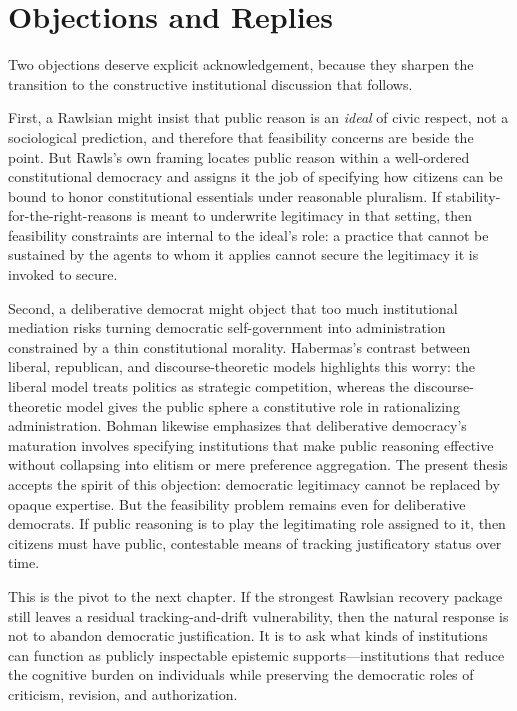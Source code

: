 \documentclass[12pt]{report}
\begin{document}
\section{Objections and Replies}

Two objections deserve explicit acknowledgement, because they sharpen the transition to the constructive institutional discussion that follows.

First, a Rawlsian might insist that public reason is an \emph{ideal} of civic respect, not a sociological prediction, and therefore that feasibility concerns are beside the point. But Rawls’s own framing locates public reason within a well-ordered constitutional democracy and assigns it the job of specifying how citizens can be bound to honor constitutional essentials under reasonable pluralism. \parencite[pp.~765--767]{rawls1997public} If stability-for-the-right-reasons is meant to underwrite legitimacy in that setting, then feasibility constraints are internal to the ideal’s role: a practice that cannot be sustained by the agents to whom it applies cannot secure the legitimacy it is invoked to secure.

Second, a deliberative democrat might object that too much institutional mediation risks turning democratic self-government into administration constrained by a thin constitutional morality. Habermas’s contrast between liberal, republican, and discourse-theoretic models highlights this worry: the liberal model treats politics as strategic competition, whereas the discourse-theoretic model gives the public sphere a constitutive role in rationalizing administration. \parencite[pp.~3, 9]{habermas1994three} Bohman likewise emphasizes that deliberative democracy’s maturation involves specifying institutions that make public reasoning effective without collapsing into elitism or mere preference aggregation. \parencite[pp.~400--403]{bohman1998comingage} The present thesis accepts the spirit of this objection: democratic legitimacy cannot be replaced by opaque expertise. But the feasibility problem remains even for deliberative democrats. If public reasoning is to play the legitimating role assigned to it, then citizens must have public, contestable means of tracking justificatory status over time.

This is the pivot to the next chapter. If the strongest Rawlsian recovery package still leaves a residual tracking-and-drift vulnerability, then the natural response is not to abandon democratic justification. It is to ask what kinds of institutions can function as publicly inspectable epistemic supports---institutions that reduce the cognitive burden on individuals while preserving the democratic roles of criticism, revision, and authorization.
\end{document}
